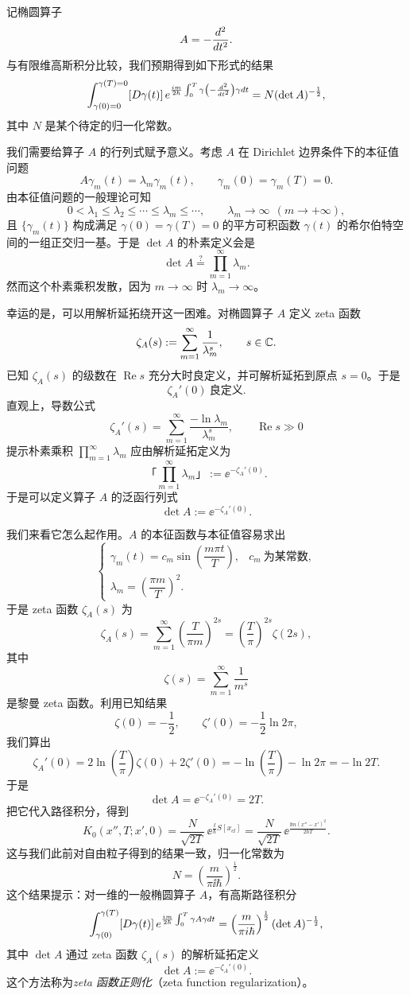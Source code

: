 记椭圆算子
\[
A=-\frac{d^2}{d t^2}.
\]
与有限维高斯积分比较，我们预期得到如下形式的结果
\[
\int_{\gamma(0)=0}^{\gamma(T)=0}[D\gamma(t)]\,
e^{\frac{i m}{2\hbar}\int_0^T
\gamma\left(-\frac{d^2}{d t^2}\right)\gamma d t}
=N(\det A)^{-\frac12},
\]
其中 $N$ 是某个待定的归一化常数。

我们需要给算子 $A$ 的行列式赋予意义。考虑 $A$ 在 Dirichlet 边界条件下的本征值问题
\[
A\gamma_m(t)=\lambda_m\gamma_m(t),\qquad \gamma_m(0)=\gamma_m(T)=0.
\]
由本征值问题的一般理论可知
\[
0<\lambda_1\le\lambda_2\le\cdots\le\lambda_m\le\cdots,
\qquad \lambda_m\to\infty\ \ (m\to+\infty),
\]
且 $\{\gamma_m(t)\}$ 构成满足 $\gamma(0)=\gamma(T)=0$ 的平方可积函数 $\gamma(t)$ 的希尔伯特空间的一组正交归一基。于是 $\det A$ 的朴素定义会是
\[
\det A\overset{?}{=}\prod_{m=1}^\infty\lambda_m.
\]
然而这个朴素乘积发散，因为 $m\to\infty$ 时 $\lambda_m\to\infty$。

幸运的是，可以用解析延拓绕开这一困难。对椭圆算子 $A$ 定义 zeta 函数
\[
\zeta_A(s):=\sum_{m=1}^\infty\frac1{\lambda_m^s},
\qquad s\in\mathbb{C}.
\]
已知 $\zeta_A(s)$ 的级数在 $\operatorname{Re}s$ 充分大时良定义，并可解析延拓到原点 $s=0$。于是
\[
\zeta_A'(0)\ \text{良定义}.
\]
直观上，导数公式
\[
\zeta_A'(s)=\sum_{m=1}^\infty\frac{-\ln\lambda_m}{\lambda_m^s},
\qquad \operatorname{Re}s\gg0
\]
提示朴素乘积 $\prod\limits_{m=1}^\infty\lambda_m$ 应由解析延拓定义为
\[
\text{「}\prod_{m=1}^\infty\lambda_m\text{」}:=\ee^{-\zeta_A'(0)}.
\]
于是可以定义算子 $A$ 的泛函行列式
\[
\det A:=\ee^{-\zeta_A'(0)}.
\]

我们来看它怎么起作用。$A$ 的本征函数与本征值容易求出
\[
\begin{cases}
\gamma_m(t)=c_m\sin\left(\dfrac{m\pi t}{T}\right), & c_m\ \text{为某常数},\\[2mm]
\lambda_m=\left(\dfrac{\pi m}{T}\right)^2. &
\end{cases}
\]
于是 zeta 函数 $\zeta_A(s)$ 为
\[
\zeta_A(s)=\sum_{m=1}^\infty\left(\frac{T}{\pi m}\right)^{2s}
=\left(\frac T\pi\right)^{2s}\zeta(2s),
\]
其中
\[
\zeta(s)=\sum_{m=1}^\infty\frac1{m^s}
\]
是黎曼 zeta 函数。利用已知结果
\[
\zeta(0)=-\frac12,\qquad \zeta'(0)=-\frac12\ln 2\pi,
\]
我们算出
\[
\zeta_A'(0)=2\ln\left(\frac T\pi\right)\zeta(0)+2\zeta'(0)
=-\ln\left(\frac T\pi\right)-\ln 2\pi=-\ln 2T.
\]
于是
\[
\det A=\ee^{-\zeta_A'(0)}=2T.
\]
把它代入路径积分，得到
\[
K_0(x'',T;x',0)=\frac{N}{\sqrt{2T}}\,\ee^{\frac{\ii}{\hbar}S[x_{cl}]}
=\frac{N}{\sqrt{2T}}\,\ee^{\frac{\ii m(x''-x')^2}{2\hbar T}}.
\]
这与我们此前对自由粒子得到的结果一致，归一化常数为
\[
N=\left(\frac{m}{\pi\ii\hbar}\right)^{\frac12}.
\]
这个结果提示：对一维的一般椭圆算子 $A$，有高斯路径积分
\[
\int_{\gamma(0)}^{\gamma(T)}[D\gamma(t)]\,
e^{\frac{i m}{2\hbar}\int_0^T\gamma A\gamma d t}
=\left(\frac{m}{\pi i\hbar}\right)^{\frac12}(\det A)^{-\frac12},
\]
其中 $\det A$ 通过 zeta 函数 $\zeta_A(s)$ 的解析延拓定义
\[
\det A:=\ee^{-\zeta_A'(0)}.
\]
这个方法称为\emph{zeta 函数正则化}（zeta function regularization）。

